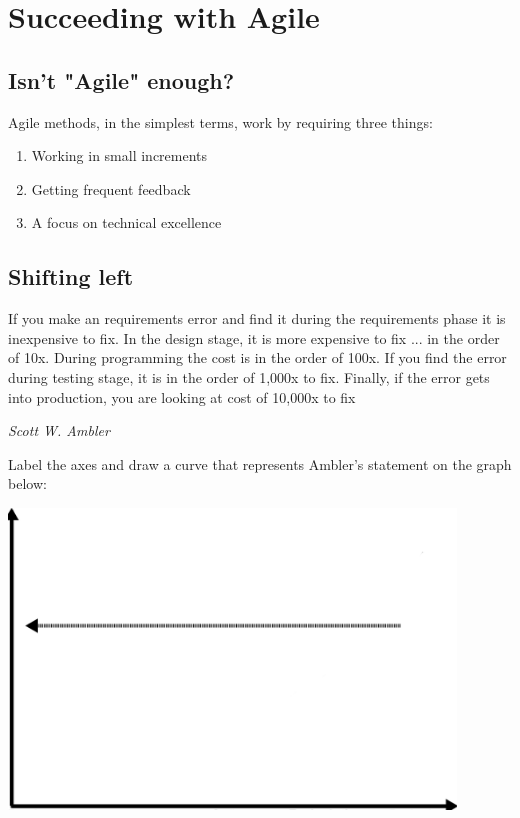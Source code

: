 \chapter*{Succeeding with Agile}

\ifnotes

\fi

\ifcontent

    \section*{Isn't "Agile" enough?}
    
    Agile methods, in the simplest terms, work by requiring three things:
    
    \begin{enumerate}
        \item Working in small increments
        \item Getting frequent feedback
        \item A focus on technical excellence
    \end{enumerate}
    
    
    \section*{Shifting left}
    
    \begin{framed}
        If you make an requirements error and find it during the requirements phase it is inexpensive to fix. In the design stage, it is more expensive to fix ... in the order of 10x. During programming the cost is in the order of 100x. If you find the error during testing stage, it is in the order of 1,000x to fix. Finally, if the error gets into production, you are looking at cost of 10,000x to fix

       \begin{flushright}
            \textit{Scott W. Ambler}
        \end{flushright}
    \end{framed}
    
    
    Label the axes and draw a curve that represents Ambler's statement on the graph below:
    
    \begin{center}
        \includegraphics[height=8cm, keepaspectratio]{images/shift-left-axes}
    \end{center}

